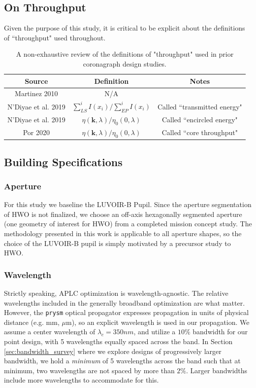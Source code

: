 \documentclass[]{spie}  %
\begin{document}
\subsection{On Throughput}
Given the purpose of this study, it is critical to be explicit about the definitions of ``throughput" used throughout. 

\begin{table}[H]
    \centering
    \begin{tabular}{c|c|c}
         Source & Definition & Notes  \\
         \hline
         Martinez 2010 \cite{martinez_2010} & N/A & \\
         N'Diyae et al. 2019\cite{Ndiaye_2019} & $\sum_{LS}^i I(x_i) / \sum_{EP}^i I(x_i)$ & Called ``transmitted energy" \\
         N'Diyae et al. 2019\cite{Ndiaye_2019} & $\eta(\mathbf{k}, \lambda) / \eta_0(0, \lambda) $ & Called ``encircled energy" \\
         Por 2020\cite{Por_2020} & $\eta(\mathbf{k}, \lambda) / \eta_0(0, \lambda) $ & Called ``core throughput" \\
         
         
    \end{tabular}
    \caption{A non-exhaustive review of the definitions of "throughput" used in prior coronagraph design studies.}
    \label{tab:placeholder}
\end{table}

\subsection{Building Specifications}

\subsubsection{Aperture}
For this study we baseline the LUVOIR-B Pupil. Since the aperture segmentation of HWO is not finalized, we choose an off-axis hexagonally segmented aperture (one geometry of interest for HWO) from a completed mission concept study. The methodology presented in this work is applicable to all aperture shapes, so the choice of the LUVOIR-B pupil is simply motivated by a precursor study to HWO. 

\subsubsection{Wavelength}
Strictly speaking, APLC optimization is wavelength-agnostic. The relative wavelengths included in the generally broadband optimization are what matter. However, the \texttt{prysm} optical propagator expresses propagation in units of physical distance (e.g. mm, $\mu$m), so an explicit wavelength is used in our propagation. We assume a center wavelength of $\lambda_c=350nm$, and utilize a $10\%$ bandwidth for our point design, with 5 wavelengths equally spaced across the band. In Section \ref{sec:bandwidth_survey} where we explore designs of progressively larger bandwidth, we hold a \emph{minimum} of 5 wavelengths across the band such that at minimum, two wavelengths are not spaced by more than $2\%$. Larger bandwidths include more wavelengths to accommodate for this.
\end{document}
